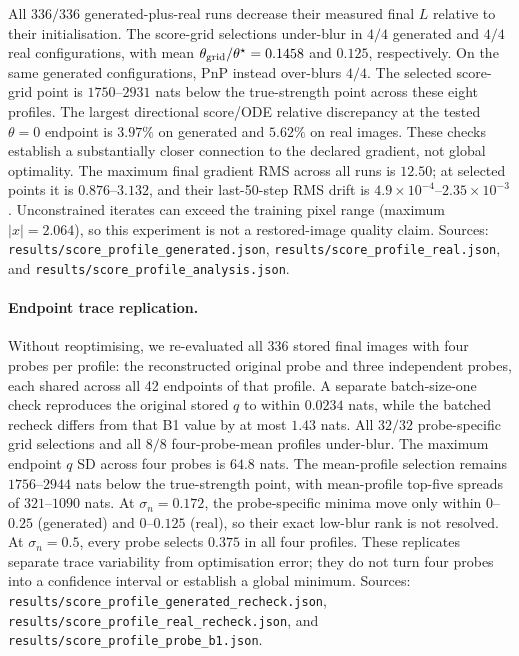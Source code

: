 \documentclass[10pt,journal]{IEEEtran}
\begin{document}
All $336/336$ generated-plus-real runs decrease their measured final $L$ relative to their
initialisation. The score-grid selections under-blur in $4/4$ generated and $4/4$ real
configurations, with mean $\theta_{\rm grid}/\theta^\star=0.1458$ and $0.125$, respectively.
On the same generated configurations, PnP instead over-blurs $4/4$. The selected score-grid
point is $1750$--$2931$ nats below the true-strength point across these eight profiles. The
largest directional score/ODE relative discrepancy at the tested $\theta=0$ endpoint is
$3.97\%$ on generated and $5.62\%$ on real images. These checks establish a substantially
closer connection to the declared gradient, not global optimality. The maximum final gradient
RMS across all runs is $12.50$; at selected points it is $0.876$--$3.132$, and their last-50-step
RMS drift is $4.9\times10^{-4}$--$2.35\times10^{-3}$. Unconstrained iterates can exceed the
training pixel range (maximum $|x|=2.064$), so this experiment is not a restored-image quality
claim. Sources: \texttt{results/score\_profile\_generated.json},
\texttt{results/score\_profile\_real.json}, and
\texttt{results/score\_profile\_analysis.json}.

\paragraph*{Endpoint trace replication.}
Without reoptimising, we re-evaluated all $336$ stored final images with four probes per
profile: the reconstructed original probe and three independent probes, each shared across all
42 endpoints of that profile. A separate batch-size-one check reproduces the original stored
$q$ to within $0.0234$ nats, while the batched recheck differs from that B1 value by at most
$1.43$ nats. All $32/32$ probe-specific grid selections and all $8/8$ four-probe-mean profiles
under-blur. The maximum endpoint $q$ SD across four probes is $64.8$ nats. The mean-profile
selection remains $1756$--$2944$ nats below the true-strength point, with mean-profile top-five
spreads of $321$--$1090$ nats. At $\sigma_n=0.172$, the probe-specific minima move only within
$0$--$0.25$ (generated) and $0$--$0.125$ (real), so their exact low-blur rank is not resolved.
At $\sigma_n=0.5$, every probe selects $0.375$ in all four profiles. These replicates separate
trace variability from optimisation error; they do not turn four probes into a confidence
interval or establish a global minimum. Sources:
\texttt{results/score\_profile\_generated\_recheck.json},
\texttt{results/score\_profile\_real\_recheck.json}, and
\texttt{results/score\_profile\_probe\_b1.json}.
\end{document}
